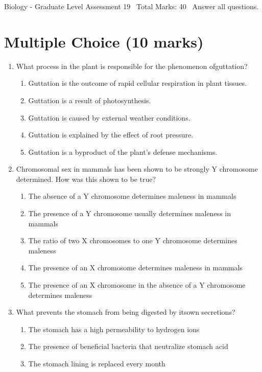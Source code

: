 \documentclass[12pt]{article}
\begin{document}
\begin{center}
Biology - Graduate Level Assessment 19 \
Total Marks: 40 \
Answer all questions.
\end{center}

\section*{Multiple Choice (10 marks)}
\begin{enumerate}[label=\arabic*.]
\item What process in the plant is responsible for the phenomenon ofguttation?
\begin{enumerate}[label=(\alph*)]
    \item Guttation is the outcome of rapid cellular respiration in plant tissues.
    \item Guttation is a result of photosynthesis.
    \item Guttation is caused by external weather conditions.
    \item Guttation is explained by the effect of root pressure.
    \item Guttation is a byproduct of the plant's defense mechanisms.
\end{enumerate}
\item Chromosomal sex in mammals has been shown to be strongly Y chromosome determined. How was this shown to be true?
\begin{enumerate}[label=(\alph*)]
    \item The absence of a Y chromosome determines maleness in mammals
    \item The presence of a Y chromosome usually determines maleness in mammals
    \item The ratio of two X chromosomes to one Y chromosome determines maleness
    \item The presence of an X chromosome determines maleness in mammals
    \item The presence of an X chromosome in the absence of a Y chromosome determines maleness
\end{enumerate}
\item What prevents the stomach from being digested by itsown secretions?
\begin{enumerate}[label=(\alph*)]
    \item The stomach has a high permeability to hydrogen ions
    \item The presence of beneficial bacteria that neutralize stomach acid
    \item The stomach lining is replaced every month

\end{enumerate}
\end{enumerate}
\end{document}
